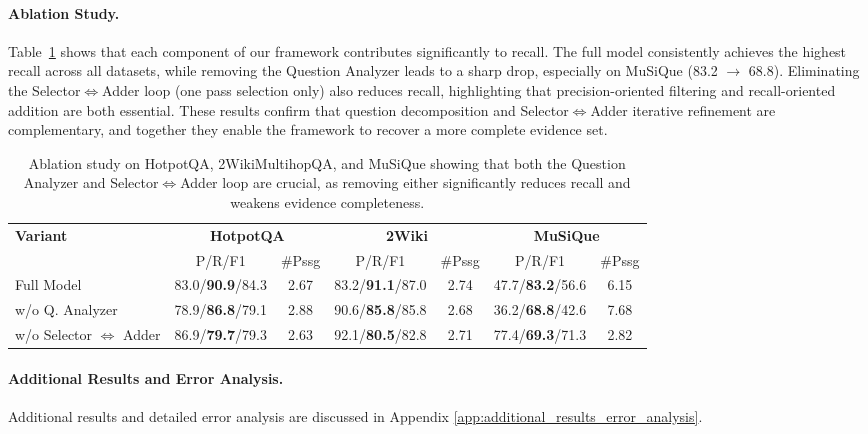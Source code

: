 \documentclass{article} %
\begin{document}
\paragraph{Ablation Study.} 
Table~\ref{tab:ablation} shows that each component of our framework contributes significantly to recall. 
The full model consistently achieves the highest recall across all datasets, while removing the Question Analyzer leads to a sharp drop, especially on MuSiQue (83.2 $\rightarrow$ 68.8). 
Eliminating the Selector$\Leftrightarrow$Adder loop (one pass selection only) also reduces recall, highlighting that precision-oriented filtering and recall-oriented addition are both essential. 
These results confirm that question decomposition and Selector$\Leftrightarrow$Adder iterative refinement are complementary, and together they enable the framework to recover a more complete evidence set.

\begin{table}[ht]
\centering
\small
\setlength{\tabcolsep}{6pt} %
\caption{Ablation study on HotpotQA, 2WikiMultihopQA, and MuSiQue showing that both the Question Analyzer and Selector$\Leftrightarrow$Adder loop are crucial, as removing either significantly reduces recall and weakens evidence completeness.}

\begin{tabular}{l|c|c|c|c|c|c}
\toprule
\multirow{2}{*}{\textbf{Variant}} 
& \multicolumn{2}{c|}{\textbf{HotpotQA}} 
& \multicolumn{2}{c|}{\textbf{2Wiki}} 
& \multicolumn{2}{c}{\textbf{MuSiQue}} \\
\cmidrule(lr){2-3} \cmidrule(lr){4-5} \cmidrule(lr){6-7}
 & P/R/F1 & \#Pssg & P/R/F1 & \#Pssg & P/R/F1 & \#Pssg \\
\midrule
Full Model & 83.0/\textbf{90.9}/84.3 & 2.67 & 83.2/\textbf{91.1}/87.0 & 2.74 & 47.7/\textbf{83.2}/56.6 & 6.15 \\
\midrule
w/o Q. Analyzer & 78.9/\textbf{86.8}/79.1 & 2.88 & 90.6/\textbf{85.8}/85.8 & 2.68 & 36.2/\textbf{68.8}/42.6 & 7.68 \\
\midrule
w/o Selector $\Leftrightarrow$ Adder & 86.9/\textbf{79.7}/79.3 & 2.63 & 92.1/\textbf{80.5}/82.8 & 2.71 & 77.4/\textbf{69.3}/71.3 & 2.82 \\
\bottomrule
\end{tabular}
\label{tab:ablation}
\end{table}


\paragraph{Additional Results and Error Analysis.} Additional results and detailed error analysis are discussed in Appendix \ref{app:additional_results_error_analysis}. 
\end{document}
